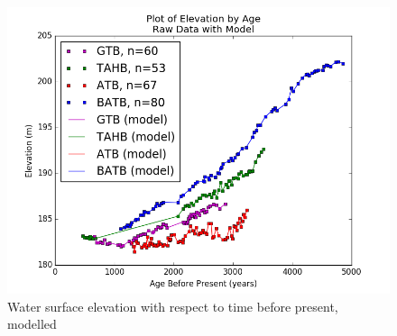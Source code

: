 \begin{figure}[h]
	\includegraphics[width=1.1\linewidth]{data/theData.png}
	\caption{Water surface elevation with respect to time before present, modelled}
	\label{fig:rawDataWithModel}
\end{figure}
\newpage
%
